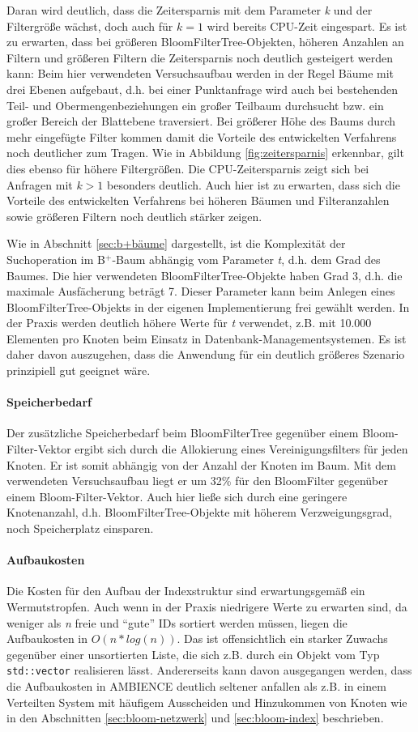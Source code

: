 Daran wird deutlich, dass die Zeitersparnis mit dem Parameter \textit{k} und der Filtergröße wächst, doch auch für $k=1$ wird bereits CPU-Zeit eingespart. Es ist zu erwarten, dass bei größeren BloomFilterTree-Objekten, höheren Anzahlen an Filtern und größeren Filtern die Zeitersparnis noch deutlich gesteigert werden kann: Beim hier verwendeten Versuchsaufbau werden in der Regel Bäume mit drei Ebenen aufgebaut, d.h. bei einer Punktanfrage wird auch bei bestehenden Teil- und Obermengenbeziehungen ein großer Teilbaum durchsucht bzw. ein großer Bereich der Blattebene traversiert. Bei größerer Höhe des Baums durch mehr eingefügte Filter kommen damit die Vorteile des entwickelten Verfahrens noch deutlicher zum Tragen. Wie in Abbildung \ref{fig:zeitersparnis} erkennbar, gilt dies ebenso für höhere Filtergrößen. Die CPU-Zeitersparnis zeigt sich bei Anfragen mit $k>1$ besonders deutlich. Auch hier ist zu erwarten, dass sich die Vorteile des entwickelten Verfahrens bei höheren Bäumen und Filteranzahlen sowie größeren Filtern noch deutlich stärker zeigen.

Wie in Abschnitt \ref{sec:b+bäume} dargestellt, ist die Komplexität der Suchoperation im B$^+$-Baum abhängig vom Parameter \textit{t}, d.h. dem Grad des Baumes. Die hier verwendeten Bloom\-Filter\-Tree-Objekte haben Grad 3, d.h. die maximale Ausfächerung beträgt 7. Dieser Parameter kann beim Anlegen eines BloomFilterTree-Objekts in der eigenen Implementierung frei gewählt werden. In der Praxis werden deutlich höhere Werte für \textit{t} verwendet, z.B. mit 10.000 Elementen pro Knoten beim Einsatz in Datenbank-Managementsystemen. Es ist daher davon auszugehen, dass die Anwendung für ein deutlich größeres Szenario prinzipiell gut geeignet wäre.  
\paragraph*{Speicherbedarf}
Der zusätzliche Speicherbedarf beim BloomFilterTree gegenüber einem Bloom-Filter-Vektor ergibt sich durch die Allokierung eines Vereinigungsfilters für jeden Knoten. Er ist somit abhängig von der Anzahl der Knoten im Baum. Mit dem verwendeten Versuchsaufbau liegt er um 32\% für den BloomFilter gegenüber einem Bloom-Filter-Vektor. Auch hier ließe sich durch eine geringere Knotenanzahl, d.h. BloomFilterTree-Objekte mit höherem Verzweigungsgrad, noch Speicherplatz einsparen.  
\paragraph*{Aufbaukosten}
Die Kosten für den Aufbau der Indexstruktur sind erwartungsgemäß ein Wermutstropfen. Auch wenn in der Praxis niedrigere Werte zu erwarten sind, da weniger als \textit{n} freie und "`gute"' IDs sortiert werden müssen, liegen die Aufbaukosten in $O(n\ast log(n))$. Das ist offensichtlich ein starker Zuwachs gegenüber einer unsortierten Liste, die sich z.B. durch ein Objekt vom Typ \texttt{std::vector} realisieren lässt. Andererseits kann davon ausgegangen werden, dass die Aufbaukosten in AMBIENCE deutlich seltener anfallen als z.B. in einem Verteilten System mit häufigem Ausscheiden und Hinzukommen von Knoten wie in den Abschnitten \ref{sec:bloom-netzwerk} und \ref{sec:bloom-index} beschrieben.
